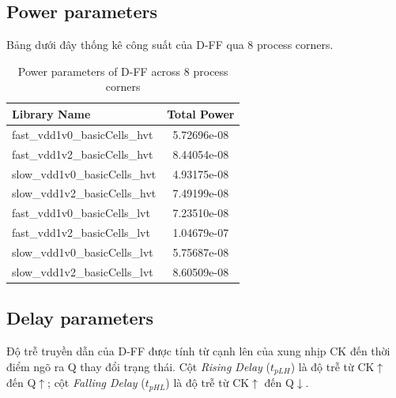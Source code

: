 \documentclass[12pt, a4paper, oneside]{article}
\begin{document}
\subsection{Power parameters}

Bảng dưới đây thống kê công suất của D-FF qua 8 process corners.

\begin{table}[H]
    \centering
    \begin{tabular}{|l|c|}
        \hline
        \textbf{Library Name} & \textbf{Total Power} \\
        \hline
        fast\_vdd1v0\_basicCells\_hvt & 5.72696e-08   \\ \hline
        fast\_vdd1v2\_basicCells\_hvt & 8.44054e-08   \\ \hline
        slow\_vdd1v0\_basicCells\_hvt & 4.93175e-08   \\ \hline
        slow\_vdd1v2\_basicCells\_hvt & 7.49199e-08   \\ \hline
        fast\_vdd1v0\_basicCells\_lvt & 7.23510e-08   \\ \hline
        fast\_vdd1v2\_basicCells\_lvt & 1.04679e-07   \\ \hline
        slow\_vdd1v0\_basicCells\_lvt & 5.75687e-08   \\ \hline
        slow\_vdd1v2\_basicCells\_lvt & 8.60509e-08   \\ \hline
    \end{tabular}
    \caption{Power parameters of D-FF across 8 process corners}
    \label{tab:exp2_power}
\end{table}

\subsection{Delay parameters}

Độ trễ truyền dẫn của D-FF được tính từ cạnh lên của xung nhịp CK đến thời điểm
ngõ ra Q thay đổi trạng thái. Cột \emph{Rising Delay} ($t_{pLH}$) là độ trễ từ
CK$\uparrow$ đến Q$\uparrow$; cột \emph{Falling Delay} ($t_{pHL}$) là độ trễ từ
CK$\uparrow$ đến Q$\downarrow$.
\end{document}
